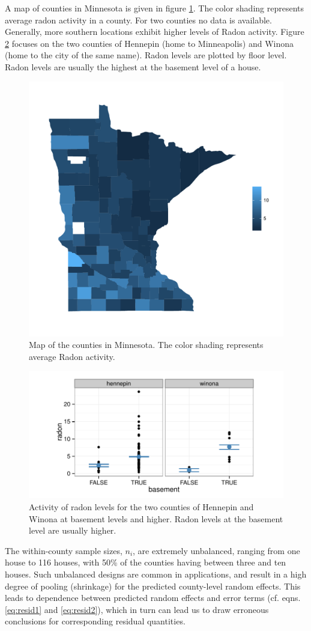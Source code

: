 \documentclass{article} %
\newcommand{\al}[1]{{\color{red} #1}}
\begin{document}
A map of counties in Minnesota is given in figure \ref{fig:map}. The color shading represents average radon activity in a county. For two counties no data is available. Generally, more southern locations exhibit higher  levels of Radon activity. Figure \ref{fig:tc} focuses on the two counties of Hennepin (home to Minneapolis) and Winona (home to the city of the same name). Radon levels are plotted by floor level. Radon levels are usually the highest at the basement level of a house. 
%
\begin{figure}[htb]
\centering
\includegraphics[width=0.5\linewidth]{figures/map.pdf}
\caption{\label{fig:map} Map of the counties in Minnesota. The color shading represents average Radon activity.}
\end{figure}
%
\begin{figure}[htb]
\centering
\includegraphics[width=0.7\linewidth]{figures/radon-twocounties.pdf}
\caption{\label{fig:tc} Activity of radon levels for the two counties of Hennepin and Winona at basement levels and higher. Radon levels at the basement level are usually higher.}
\end{figure}
%
The within-county sample sizes, $n_i$, are extremely unbalanced, ranging from one house to 116 houses, with 50\% of the counties having between three and ten houses. Such unbalanced designs are common in applications, and result in a high degree of pooling \al{(shrinkage)} for the predicted county-level random effects. %
This leads to dependence between  predicted random effects and  error terms (cf. eqns. \ref{eq:resid1} and \ref{eq:resid2}), which in turn can lead us to draw erroneous conclusions for corresponding residual quantities.
\end{document}
